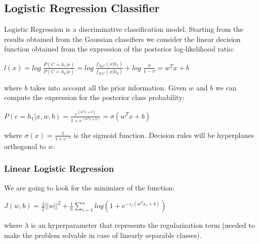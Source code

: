 \documentclass[10pt, a4paper, twocolumn]{article} %
\begin{document}
\subsection{Logistic Regression Classifier}
Logistic Regression is a discriminative classification model. Starting from the results obtained
from the Gaussian classifiers we consider the linear decision function obtained from the expression
of the posterior log-likelihood ratio:
\begin{center}
	\begin{math}
		l(x) = log\;\frac{P(C=h_1|x)}{P(C=h_0|x)}=log\;\frac{f_{X|C}(x|h_1)}{f_{X|C}(x|h_0)} + log\;\frac{\pi}{1-\pi} = w^Tx + b
	\end{math}
\end{center}
where $b$ takes into account all the prior information. Given $w$ and $b$ we can compute the
expression for the posterior class probability:
\begin{center}
	\begin{math}
		P(c=h_1|x,w,b)=\frac{e^{(w^Tx + b)}}{1+e^{(w^Tx+b)}}=\sigma(w^Tx+b)
	\end{math}
\end{center}
where $\sigma(x)=\frac{1}{1+e^{-x}}$ is the sigmoid function. Decision rules will be hyperplanes
orthogonal to $w$.
\subsubsection{Linear Logistic Regression}
We are going to look for the minimizer of the function:
\begin{center}
	\begin{math}
		J(w,b) = \frac{\lambda}{2}||w||^2 + \frac{1}{n}\sum_{i=1}^{n}log(1 + e^{-z_i(w^Tx_i+b)})
	\end{math}
\end{center}
where $\lambda$ is an hyperparameter that represents the regularization term (needed to make the 
problem solvable in case of linearly separable classes).
\end{document}
